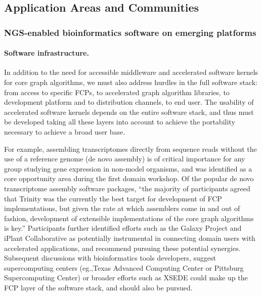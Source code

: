 \subsection{Application Areas and Communities}

\subsubsection{NGS-enabled bioinformatics software on emerging platforms}


\paragraph{Software infrastructure.} In addition to the need for accessible middleware and accelerated software kernels for core graph algorithms, we must also address hurdles in the full software stack: from access to specific FCPs, to accelerated graph algorithm libraries, to development platform and to distribution channels, to end user. The usability of accelerated software kernels depends on the entire software stack, and thus must be developed taking all these layers into account to achieve the portability necessary to achieve a broad user base.

For example, assembling transcriptomes directly from sequence reads without the use of a reference genome (de novo assembly) is of critical importance for any group studying gene expression in non-model organisms, and was identified as a core opportunity area during the first domain workshop. Of the popular de novo transcriptome assembly software packages, “the majority of participants agreed that Trinity \cite{trinity} was the currently the best target for development of FCP implementations, but given the rate at which assemblers come in and out of fashion, development of extensible implementations of the core graph algorithms is key.”\cite{wiki} Participants further identified efforts such as the Galaxy Project and iPlant Collaborative as potentially instrumental in connecting domain users with accelerated applications, and recommend pursuing these potential synergies. Subsequent discussions with bioinformatics tools developers, suggest supercomputing centers (eg.,Texas Advanced Computing Center or Pittsburg Supercomputing Center) or broader efforts such as XSEDE \cite{xsede} could make up the FCP layer of the software stack, and should also be pursued.

